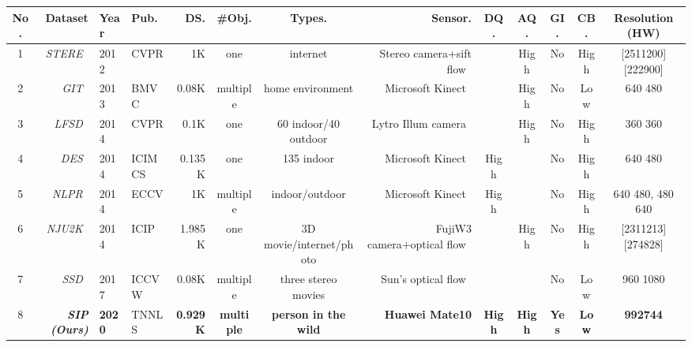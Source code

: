 \documentclass[journal]{IEEEtran}
\def\eg{\emph{e.g.}}
\newcommand{\figref}[1]{Fig.~\ref{#1}}
\begin{document}
\begin{table*}[t!]
  \centering
  \scriptsize
  \renewcommand{\arraystretch}{1.0}
  \renewcommand{\tabcolsep}{1.0mm}
\caption{Comparison of current RGB-D datasets in terms of year
  	(\textbf{Year}), publication (\textbf{Pub.}),
  	dataset size (\textbf{DS.}), number of objects in the images (\textbf{\#Obj.}),
	type of scene (\textbf{Types.}), depth sensor (\textbf{Sensor.}),
	depth quality (\textbf{DQ.},
	\eg, high-quality depth map suffers from less random noise.
See last row in \figref{fig:DepthQuality}), annotation quality (\textbf{AQ.},
  	see \figref{fig:labelQuality}),
    whether or not provide grayscale image from monocular camera (\textbf{GI.}),
    center bias (\textbf{CB.}, see \figref{fig:datasetStatistics} (a)-(b)),
    and resolution (in pixel).
    H \& W denote the height and width of the image, respectively.
  }\label{tab:DatasetSummary}
  \begin{tabular}{c|r||l|l|r|c|c|r|c|c|c|c|c}
    \hline\toprule
No.& Dataset & Year & Pub. & DS. &\#Obj.&Types. & Sensor. & DQ. & AQ. &GI.&CB. &Resolution (HW)\\
    \midrule
    \midrule
1 &\textit{STERE}~\cite{niu2012leveraging} & 2012&CVPR  & 1K     & one & internet               & Stereo camera+sift flow~\cite{liu2011sift} &      & High & No & High & [2511200][222900]\\
  2 &\textit{GIT}~\cite{ciptadi2013depth}    & 2013&BMVC  & 0.08K  & multiple  & home environment       & Microsoft Kinect~\cite{zhang2012microsoft} &      & High & No & Low  &640  480\\
  3 &\textit{LFSD}~\cite{li2014saliency}     & 2014&CVPR  & 0.1K   & one       & 60 indoor/40 outdoor   & Lytro Illum camera~\cite{ng2005light}      &      & High & No & High &360  360 \\
  4 &\textit{DES}~\cite{cheng2014depth}      & 2014&ICIMCS& 0.135K & one       & 135 indoor             & Microsoft Kinect~\cite{zhang2012microsoft} & High &      & No & High &640  480 \\
  5 &\textit{NLPR}~\cite{peng2014rgbd}       & 2014&ECCV  & 1K     & multiple  & indoor/outdoor         & Microsoft Kinect~\cite{zhang2012microsoft} & High &      & No & High &640  480, 480  640  \\
  6 &\textit{NJU2K}~\cite{ju2014depth}       & 2014&ICIP  & 1.985K & one & 3D movie/internet/photo& FujiW3 camera+optical flow~\cite{sun2010secrets}& & High & No & High & [2311213][274828]\\
  7 &\textit{SSD}~\cite{zhu2017three}        & 2017&ICCVW & 0.08K  & multiple  & three stereo movies    & Sun's optical flow~\cite{sun2010secrets}   &      &      & No & Low  & 960  1080 \\
    \midrule
  \rowcolor{mygray}
  8 &\textbf{\emph{SIP (Ours)}}              & \textbf{2020}&  TNNLS    & \textbf{0.929K}     & \textbf{multiple}  & \textbf{person in the wild}     & \textbf{Huawei Mate10}                              & \textbf{High} & \textbf{High} & \textbf{Yes} & \textbf{Low}  &\textbf{992744}\\
    \bottomrule
    \hline
  \end{tabular}
\end{table*}
\end{document}
